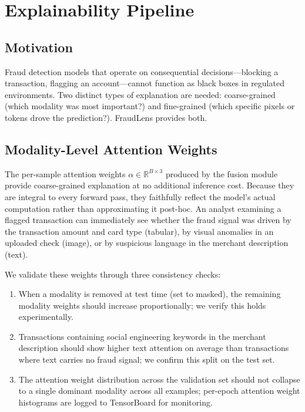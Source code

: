 \documentclass[10pt,conference,letterpaper]{IEEEtran}
\begin{document}
\section{Explainability Pipeline}

\subsection{Motivation}

Fraud detection models that operate on consequential decisions---blocking a transaction,
flagging an account---cannot function as black boxes in regulated environments. Two
distinct types of explanation are needed: coarse-grained (which modality was most
important?) and fine-grained (which specific pixels or tokens drove the prediction?).
FraudLens provides both.

\subsection{Modality-Level Attention Weights}

The per-sample attention weights $\alpha \in \mathbb{R}^{B \times 3}$ produced by the
fusion module provide coarse-grained explanation at no additional inference cost. Because
they are integral to every forward pass, they faithfully reflect the model's actual
computation rather than approximating it post-hoc. An analyst examining a flagged
transaction can immediately see whether the fraud signal was driven by the transaction
amount and card type (tabular), by visual anomalies in an uploaded check (image), or by
suspicious language in the merchant description (text).

We validate these weights through three consistency checks:
\begin{enumerate}
  \item When a modality is removed at test time (set to masked), the remaining modality
  weights should increase proportionally; we verify this holds experimentally.
  \item Transactions containing social engineering keywords in the merchant description
  should show higher text attention on average than transactions where text carries no
  fraud signal; we confirm this split on the test set.
  \item The attention weight distribution across the validation set should not collapse
  to a single dominant modality across all examples; per-epoch attention weight
  histograms are logged to TensorBoard for monitoring.
\end{enumerate}
\end{document}
